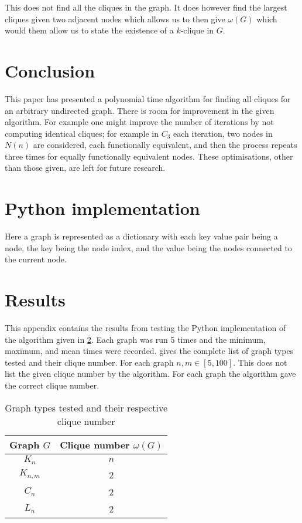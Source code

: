 \documentclass[11pt]{article}
\begin{document}
This does not find all the cliques in the graph. It does however find the largest cliques given two adjacent nodes which allows us to then give $\omega(G)$ which would them allow us to state the existence of a $k$-clique in $G$.

\section{Conclusion}

This paper has presented a polynomial time algorithm for finding all cliques for an arbitrary undirected graph. There is room for improvement in the given algorithm. For example one might improve the number of iterations by not computing identical cliques; for example in $C_3$ each iteration, two nodes in $N(n)$ are considered, each functionally equivalent, and then the process repeats three times for equally functionally equivalent nodes. These optimisations, other than those given, are left for future research.

\appendix
\section{Python implementation}
\label{apdx:a}
Here a graph is represented as a dictionary with each key value pair being a node, the key being the node index, and the value being the nodes connected to the current node.


\section{Results}
This appendix contains the results from testing the Python implementation of the algorithm given in \cref{apdx:a}. Each graph was run 5 times and the minimum, maximum, and mean times were recorded.  gives the complete list of graph types tested and their clique number. For each graph $n,m\in[5,100]$. This does not list the given clique number by the algorithm. For each graph the algorithm gave the correct clique number.

\begin{table}[h]
	\centering
	\begin{tabular}{c|c}
		Graph $G$ & Clique number $\omega(G)$\\\hline
		$K_n$ & $n$\\
		$K_{n,m}$ & 2\\
		$C_n$ & 2\\
		$L_n$ & 2\\
	\end{tabular}
	\caption{Graph types tested and their respective clique number}
	\label{tab:test-graphs}
\end{table}
\end{document}
